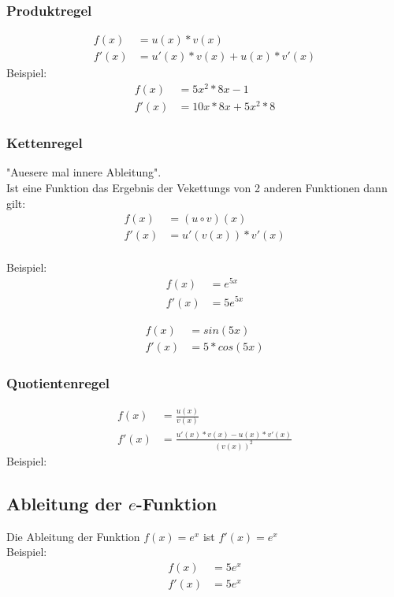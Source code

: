 \documentclass[a4paper]{article} %
\begin{document}
	\subsubsection{Produktregel}
	\begin{align*}
		f(x)&=u(x)*v(x)\\
		f'(x)&=u'(x)*v(x)+u(x)*v'(x)
	\end{align*}
	Beispiel: \\ 
	\begin{align*}
		f(x) &= 5x^2*8x-1  \\
		f'(x)&= 10x*8x+5x^2*8
	\end{align*}
	\subsubsection{Kettenregel}
	"Auesere mal innere Ableitung".\\
	Ist eine Funktion das Ergebnis der Vekettungs von 2 anderen Funktionen dann gilt:\\
	 \begin{align*}
		f(x)&=(u \circ v)(x)\\
		f'(x)&=u'(v(x))*v'(x)
	\end{align*}
	\\Beispiel:\\
		\begin{align*}
		f(x) &=e^{5x}\\
		f'(x)&=5e^{5x}
		\end{align*}

		\begin{align*}
		f(x)&=sin(5x)\\
		f'(x)&=5*cos(5x)
		\end{align*}

	\subsubsection{Quotientenregel}
		\begin{align*}
		f(x)&=\frac{u(x)}{v(x)}\\
		f'(x)&=\frac{u'(x)*v(x)-u(x)*v'(x)}{(v(x))^2}
		\end{align*}
		Beispiel: \\ 
	
	\subsection{Ableitung der $e$-Funktion}
	Die Ableitung der Funktion $f(x)=e^x$ ist $f'(x)=e^x$
	\\Beispiel:\\
	\begin{align*}
		f(x)&=5e^x\\
		f'(x)&=5e^x
	\end{align*}
\end{document}
